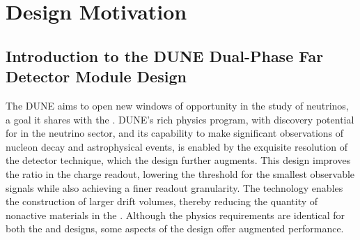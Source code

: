 \chapter{Design Motivation}
\label{ch:fddp-design}

\section{Introduction to the DUNE Dual-Phase Far Detector Module Design}
\label{sec:fddp-design-highlight}


The DUNE   aims to open new windows of opportunity in the study of neutrinos, a goal it shares with the . 
 DUNE's rich physics program, with discovery potential for  in the neutrino sector, and its capability to make significant observations of nucleon decay and astrophysical events, is enabled by the exquisite resolution of the \lartpc detector technique, which the \dual design further augments. This design improves the  ratio in the charge readout,  lowering the threshold for the smallest observable signals while also achieving a finer readout granularity.  The \dual technology enables the construction of larger drift volumes, thereby reducing %
the quantity of nonactive materials in the \lar. Although the physics requirements are identical for both the \single and \dual designs, %
 some aspects of the \dual design offer augmented performance. %

